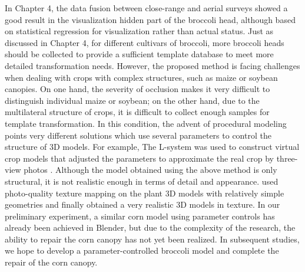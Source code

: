 In Chapter 4, the data fusion between close-range and aerial surveys showed a good result in the visualization hidden part of the broccoli head, although based on statistical regression for visualization rather than actual status. Just as discussed in Chapter 4, for different cultivars of broccoli, more broccoli heads should be collected to provide a sufficient template database to meet more detailed transformation needs. However, the proposed method is facing challenges when dealing with crops with complex structures, such as maize or soybean canopies. On one hand, the severity of occlusion makes it very difficult to distinguish individual maize or soybean; on the other hand, due to the multilateral structure of crops, it is difficult to collect enough samples for template transformation. In this condition, the advent of procedural modeling points very different solutions which use several parameters to control the structure of 3D models. For example, The L-system was used to construct virtual crop models that adjusted the parameters to approximate the real crop by three-view photos \citep{cieslak_l-system_2021}. Although the model obtained using the above method is only structural, it is not realistic enough in terms of detail and appearance. \citet{mikami_hidden_2022} used photo-quality texture mapping on the plant 3D models with relatively simple geometries and finally obtained a very realistic 3D models in texture. In our preliminary experiment, a similar corn model using parameter controls has already been achieved in Blender, but due to the complexity of the research, the ability to repair the corn canopy has not yet been realized. In subsequent studies, we hope to develop a parameter-controlled broccoli model and complete the repair of the corn canopy.


